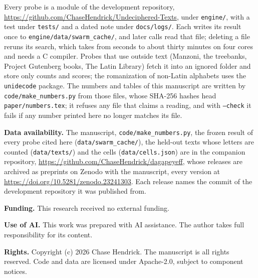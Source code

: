\documentclass[11pt]{article}
\theoremstyle{definition}
\begin{document}
Every probe is a module of the development repository, \url{https://github.com/ChaseHendrick/Undeciphered-Texts}, under \texttt{engine/}, with a test under \texttt{tests/} and a dated note under \texttt{docs/logs/}. Each writes its result once to \texttt{engine/data/swarm\_cache/}, and later calls read that file; deleting a file reruns its search, which takes from seconds to about thirty minutes on four cores and needs a C compiler. Probes that use outside text (Manzoni, the treebanks, Project Gutenberg books, The Latin Library) fetch it into an ignored folder and store only counts and scores; the romanization of non-Latin alphabets uses the \texttt{unidecode} package. The numbers and tables of this manuscript are written by \texttt{code/make\_numbers.py} from those files, whose SHA-256 hashes head \texttt{paper/numbers.tex}; it refuses any file that claims a reading, and with \texttt{--check} it fails if any number printed here no longer matches its file.

{\raggedright\noindent\textbf{Data availability.} The manuscript, \texttt{code/make\_numbers.py}, the frozen result of every probe cited here (\texttt{data/swarm\_cache/}), the held-out texts whose letters are counted (\texttt{data/texts/}) and the cells (\texttt{data/cells.json}) are in the companion repository, \url{https://github.com/ChaseHendrick/dagapeyeff}, whose releases are archived as preprints on Zenodo with the manuscript, every version at \url{https://doi.org/10.5281/zenodo.23241303}. Each release names the commit of the development repository it was published from.\par}

\noindent\textbf{Funding.} This research received no external funding.

\noindent\textbf{Use of AI.} This work was prepared with AI assistance. The author takes full responsibility for its content.

{\raggedright\noindent\textbf{Rights.} Copyright (c) 2026 Chase Hendrick. The manuscript is all rights reserved. Code and data are licensed under Apache-2.0, subject to component notices.\par}



\end{document}
